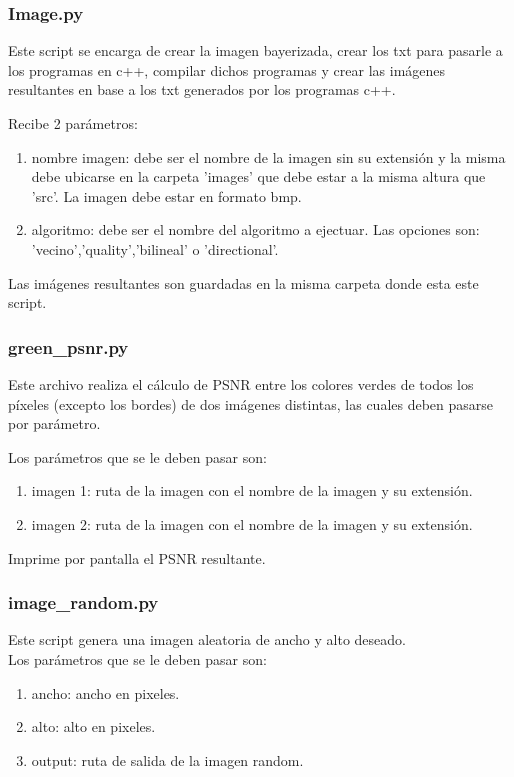 \subsubsection{Image.py}

Este script se encarga de crear la imagen bayerizada, crear los txt para pasarle a los programas en c++, compilar dichos programas y crear las imágenes resultantes en base a los txt generados por los programas c++.

Recibe 2 parámetros:
\begin{enumerate}
\item nombre imagen: debe ser el nombre de la imagen sin su extensi\'on y la misma debe ubicarse en la carpeta 'images' que debe estar a la misma altura que 'src'. La imagen debe estar en formato bmp.
\item algoritmo: debe ser el nombre del algoritmo a ejectuar. Las opciones son: 'vecino','quality','bilineal' o 'directional'.
\end{enumerate}

Las imágenes resultantes son guardadas en la misma carpeta donde esta este script.

\subsubsection{green\_psnr.py}

Este archivo realiza el cálculo de PSNR entre los colores verdes de todos los píxeles (excepto los bordes) de dos imágenes distintas, las cuales deben pasarse por parámetro.

Los parámetros que se le deben pasar son:
\begin{enumerate}
\item imagen 1: ruta de la imagen con el nombre de la imagen y su extensi\'on. 
\item imagen 2: ruta de la imagen con el nombre de la imagen y su extensi\'on.
\end{enumerate}

Imprime por pantalla el PSNR resultante.

\subsubsection{image\_random.py}

Este script genera una imagen aleatoria de ancho y alto deseado.\\
Los parámetros que se le deben pasar son:\\
\begin{enumerate}
\item ancho: ancho en pixeles. 
\item alto: alto en pixeles.
\item output: ruta de salida de la imagen random.
\end{enumerate}


